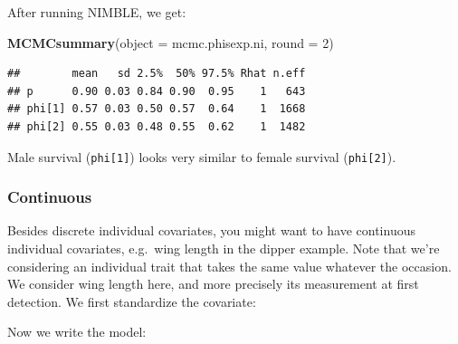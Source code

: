 \documentclass[
  12pt,
]{krantz}
\newenvironment{Shaded}{\begin{snugshade}}{\end{snugshade}}
\newcommand{\AttributeTok}[1]{\textcolor[rgb]{0.13,0.29,0.53}{#1}}
\newcommand{\DecValTok}[1]{\textcolor[rgb]{0.00,0.00,0.81}{#1}}
\newcommand{\DocumentationTok}[1]{\textcolor[rgb]{0.56,0.35,0.01}{\textbf{\textit{#1}}}}
\newcommand{\FunctionTok}[1]{\textcolor[rgb]{0.13,0.29,0.53}{\textbf{#1}}}
\newcommand{\NormalTok}[1]{#1}
\newcommand{\OtherTok}[1]{\textcolor[rgb]{0.56,0.35,0.01}{#1}}
\newcommand{\SpecialCharTok}[1]{\textcolor[rgb]{0.81,0.36,0.00}{\textbf{#1}}}
\begin{document}
After running NIMBLE, we get:

\begin{Shaded}
\begin{Highlighting}[]
\FunctionTok{MCMCsummary}\NormalTok{(}\AttributeTok{object =}\NormalTok{ mcmc.phisexp.ni, }\AttributeTok{round =} \DecValTok{2}\NormalTok{)}
\end{Highlighting}
\end{Shaded}

\begin{verbatim}
##        mean   sd 2.5%  50% 97.5% Rhat n.eff
## p      0.90 0.03 0.84 0.90  0.95    1   643
## phi[1] 0.57 0.03 0.50 0.57  0.64    1  1668
## phi[2] 0.55 0.03 0.48 0.55  0.62    1  1482
\end{verbatim}

Male survival (\texttt{phi{[}1{]}}) looks very similar to female survival (\texttt{phi{[}2{]}}).

\subsubsection{Continuous}\label{continuous-1}

Besides discrete individual covariates, you might want to have continuous individual covariates, e.g.~wing length in the dipper example. Note that we're considering an individual trait that takes the same value whatever the occasion. We consider wing length here, and more precisely its measurement at first detection. We first standardize the covariate:

\begin{Shaded}
\end{Shaded}

Now we write the model:
\end{document}
